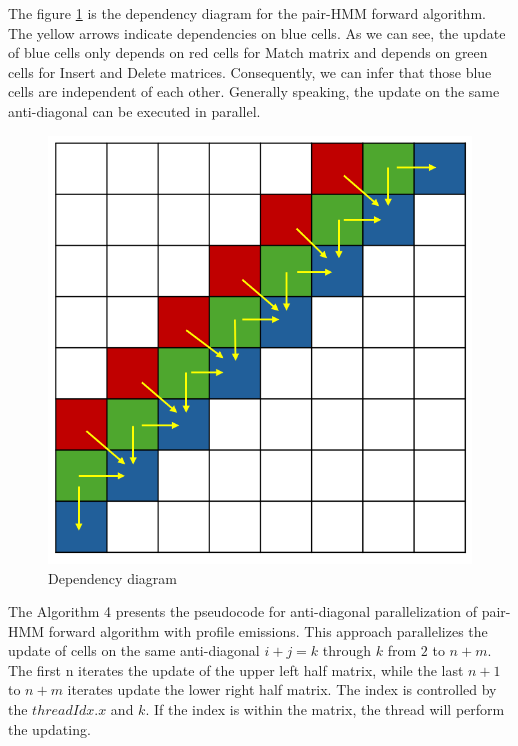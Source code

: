 \documentclass[PhD]{PHlab-thesis}
\begin{document}
The figure \ref{fig:dependency diagram} is the dependency diagram for the pair-HMM forward algorithm. The yellow arrows indicate dependencies on blue cells. As we can see, the update of blue cells only depends on red cells for Match matrix and depends on green cells for Insert and Delete matrices. Consequently, we can infer that those blue cells are independent of each other. Generally speaking, the update on the same anti-diagonal can be executed in parallel.
\begin{figure}[h]
        \centering
        \includegraphics[width=0.7\linewidth]{figure/anti-diagonal.png}
        \caption{Dependency diagram}
        \label{fig:dependency diagram} 
\end{figure}
\newpage
The Algorithm 4 presents the pseudocode for anti-diagonal parallelization of pair-HMM forward algorithm with profile emissions. This approach parallelizes the update of cells on the same anti-diagonal $i+j=k$ through $k$ from $2$ to $n+m$. The first n iterates the update of the upper left half matrix, while the last $n+1$ to $n+m$ iterates update the lower right half matrix. The index is controlled by the $threadIdx.x$ and $k$. If the index is within the matrix, the thread will perform the updating.
\vspace{0.5cm}
\end{document}
